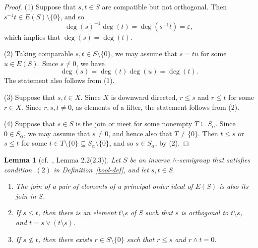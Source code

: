 \documentclass[a4paper,reqno,12pt]{amsart}
\numberwithin{equation}{section}
\theoremstyle{plain}
\newtheorem{lemma}[thm]{Lemma}
\theoremstyle{definition}
\begin{document}
\begin{proof}
(1) Suppose that $s,t \in S$ are compatible but not orthogonal. Then $s^{-1}t \in E(S) \setminus \{0\}$, and so 
\[\deg(s)^{-1}\deg(t) = \deg(s^{-1}t) = \varepsilon,\]
which implies that $\deg(s)=\deg(t)$.

\smallskip

(2) Taking comparable $s,t \in S \setminus \{0\}$, we may assume that $s=tu$ for some $u \in E(S)$. Since $s \neq 0$, we have
\[\deg(s) = \deg(t)\deg(u) = \deg(t).\]
The statement also follows from (1).

\smallskip

(3) Suppose that $s, t\in X$. Since $X$ is downward directed, $r \leq s$ and $r \leq t$ for some $r \in X$. Since $r,s,t \neq 0$, as elements of a filter, the statement follows from (2).

\smallskip

(4) Suppose that $s \in S$ is the join or meet for some nonempty $T \subseteq S_{\alpha}$. Since $0 \in S_{\alpha}$, we may assume that $s \neq 0$, and hence also that $T \neq \{0\}$. Then $t \leq s$ or $s \leq t$ for some $t \in T\setminus \{0\} \subseteq S_{\alpha} \setminus \{0\}$, and so $s \in S_{\alpha}$, by (2).
\end{proof}

\begin{lemma}[cf.\ \cite{Lawson2}, Lemma 2.2(2,3)] \label{comp-lem}
Let $S$ be an inverse $\land$-semigroup that satisfies condition $\, (2)$ in Definition~\ref{bool-def}, and let $s,t \in S$.  
\begin{enumerate}[\upshape(1)]
\item The join of a pair of elements of a principal order ideal of $E(S)$ is also its join in $S$.

\smallskip 

\item If $s\leq t$, then there is an element $t \setminus s$ of $S$ such that $s$ is orthogonal to $t \setminus s$, and $t = s \lor (t \setminus s)$.

\smallskip 

\item If $s\not\leq t$, then there exists $r \in S\setminus \{0\}$ such that $r \leq s$ and $r\land t = 0$.
\end{enumerate}
\end{lemma}
\end{document}
